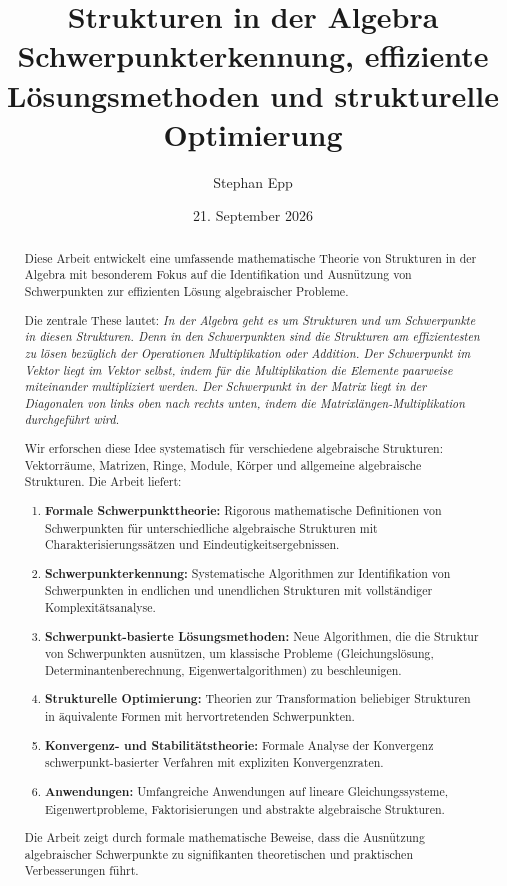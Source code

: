 \documentclass[a4paper,12pt]{article}
\title{\textbf{Strukturen in der Algebra}\\
Schwerpunkterkennung, effiziente Lösungsmethoden und strukturelle Optimierung}
\author{Stephan Epp}
\date{21. September 2026}
\theoremstyle{definition}
\begin{document}
\maketitle

\begin{abstract}
Diese Arbeit entwickelt eine umfassende mathematische Theorie von Strukturen in der Algebra mit besonderem Fokus auf die Identifikation und Ausnützung von Schwerpunkten zur effizienten Lösung algebraischer Probleme. 

Die zentrale These lautet: \emph{In der Algebra geht es um Strukturen und um Schwerpunkte in diesen Strukturen. Denn in den Schwerpunkten sind die Strukturen am effizientesten zu lösen bezüglich der Operationen Multiplikation oder Addition. Der Schwerpunkt im Vektor liegt im Vektor selbst, indem für die Multiplikation die Elemente paarweise miteinander multipliziert werden. Der Schwerpunkt in der Matrix liegt in der Diagonalen von links oben nach rechts unten, indem die Matrixlängen-Multiplikation durchgeführt wird.}

Wir erforschen diese Idee systematisch für verschiedene algebraische Strukturen: Vektorräume, Matrizen, Ringe, Module, Körper und allgemeine algebraische Strukturen. Die Arbeit liefert:

\begin{enumerate}
\item \textbf{Formale Schwerpunkttheorie:} Rigorous mathematische Definitionen von Schwerpunkten für unterschiedliche algebraische Strukturen mit Charakterisierungssätzen und Eindeutigkeitsergebnissen.

\item \textbf{Schwerpunkterkennung:} Systematische Algorithmen zur Identifikation von Schwerpunkten in endlichen und unendlichen Strukturen mit vollständiger Komplexitätsanalyse.

\item \textbf{Schwerpunkt-basierte Lösungsmethoden:} Neue Algorithmen, die die Struktur von Schwerpunkten ausnützen, um klassische Probleme (Gleichungslösung, Determinantenberechnung, Eigenwertalgorithmen) zu beschleunigen.

\item \textbf{Strukturelle Optimierung:} Theorien zur Transformation beliebiger Strukturen in äquivalente Formen mit hervortretenden Schwerpunkten.

\item \textbf{Konvergenz- und Stabilitätstheorie:} Formale Analyse der Konvergenz schwerpunkt-basierter Verfahren mit expliziten Konvergenzraten.

\item \textbf{Anwendungen:} Umfangreiche Anwendungen auf lineare Gleichungssysteme, Eigenwertprobleme, Faktorisierungen und abstrakte algebraische Strukturen.
\end{enumerate}

Die Arbeit zeigt durch formale mathematische Beweise, dass die Ausnützung algebraischer Schwerpunkte zu signifikanten theoretischen und praktischen Verbesserungen führt.
\end{abstract}
\end{document}
